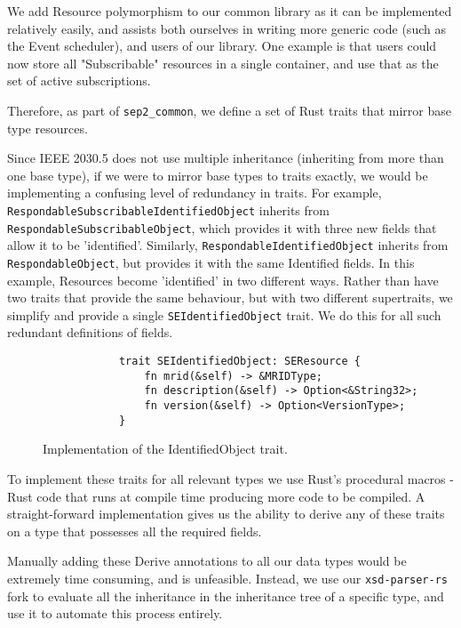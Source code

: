 We add Resource polymorphism to our common library as it can be implemented relatively easily, and assists both ourselves in writing more generic code (such as the Event scheduler), and users of our library. One example is that users could now store all "Subscribable" resources in a single container, and use that as the set of active subscriptions.

Therefore, as part of \texttt{sep2\_common}, we define a set of Rust traits that mirror base type resources. 

Since IEEE 2030.5 does not use multiple inheritance (inheriting from more than one base type), if we were to mirror base types to traits exactly, we would be implementing a confusing level of redundancy in traits.
For example, \texttt{RespondableSubscribableIdentifiedObject} inherits from \texttt{RespondableSubscribableObject}, which provides it with three new fields that allow it to be 'identified'. Similarly, \texttt{RespondableIdentifiedObject} inherits from \texttt{RespondableObject}, but provides it with the same Identified fields. In this example, Resources become 'identified' in two different ways. Rather than have two traits that provide the same behaviour, but with two different supertraits, we simplify and provide a single \texttt{SEIdentifiedObject} trait. We do this for all such redundant definitions of fields.

\begin{figure}[H]
    \begin{center}
        \begin{lstlisting}
            trait SEIdentifiedObject: SEResource {
                fn mrid(&self) -> &MRIDType;
                fn description(&self) -> Option<&String32>;
                fn version(&self) -> Option<VersionType>;
            }
        \end{lstlisting}
        \label{fig:identtrait}
        \caption{Implementation of the IdentifiedObject trait.}
    \end{center}
\end{figure}

To implement these traits for all relevant types we use Rust's procedural macros - Rust code that runs at compile time producing more code to be compiled. A straight-forward implementation gives us the ability to derive any of these traits on a type that possesses all the required fields.

Manually adding these Derive annotations to all our data types would be extremely time consuming, and is unfeasible. Instead, we use our \texttt{xsd-parser-rs} fork to evaluate all the inheritance in the inheritance tree of a specific type, and use it to automate this process entirely. 

